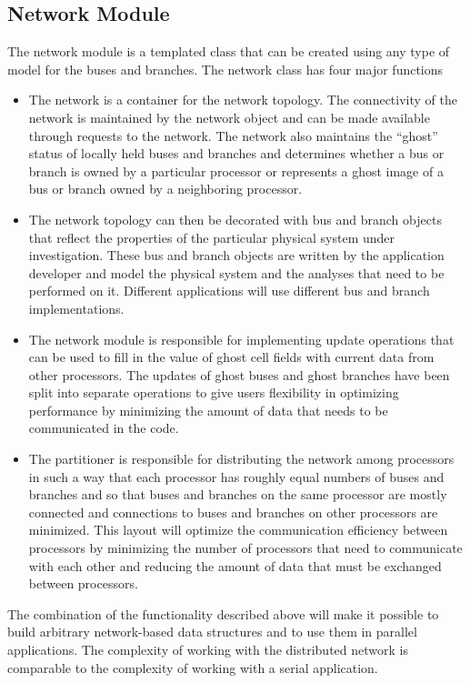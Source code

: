 \documentclass{acm_proc_article-sp}
\begin{document}
\subsection{Network Module}
The network module is a templated class that can be created using any type of
model for the buses and branches. The network class has four major functions
\begin{itemize}
\item The network is a container for the network topology. The connectivity of the network
is maintained by the network object and can be made available through requests to the
network. The network also maintains the ``ghost'' status of locally held buses and
branches and determines whether a bus or branch is owned by a particular processor or
represents a ghost image of a bus or branch owned by a neighboring processor.

\item The network topology can then be decorated with bus and branch objects that reflect
the properties of the particular physical system under investigation. These bus and
branch objects are written by the application developer and model the
physical system and the analyses that need to be performed on it.
Different applications will use different bus and branch implementations.

\item The network module is responsible for implementing update operations that can be
used to fill in the value of ghost cell fields with current data from other processors.
The updates of ghost buses and ghost branches have been split into separate operations to
give users flexibility in optimizing performance by minimizing the amount of data that
needs to be communicated in the code.

\item The partitioner is responsible for distributing the network among
processors in such a way that each processor has roughly equal numbers of buses and
branches and so that buses and branches on the same processor are
mostly connected and connections to buses and branches on other processors are
minimized. This layout will optimize the communication efficiency between processors by
minimizing the number of processors that need to communicate with each other and
reducing the amount of data that must be exchanged between processors.
\end{itemize}

The combination of the functionality described above will make it possible to
build arbitrary network-based data structures and to use them in parallel
applications. The complexity of working with
the distributed network is comparable to the complexity of working with a serial
application.
\end{document}

